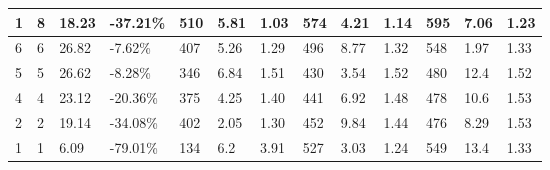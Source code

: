 \begin{table*}[!ht]
\begin{tabular}{|l|l|l|l|l|l|l|l|l|l|l|l|l|}
        1 & 8 & 18.23 & -37.21\% & 510 & 5.81 & 1.03 & 574 & 4.21 & 1.14 & 595 & 7.06 & 1.23 \\ \hline
        6 & 6 & 26.82 & -7.62\% & 407 & 5.26 & 1.29 & 496 & 8.77 & 1.32 & 548 & 1.97 & 1.33 \\ \hline
        5 & 5 & 26.62 & -8.28\% & 346 & 6.84 & 1.51 & 430 & 3.54 & 1.52 & 480 & 12.4 & 1.52 \\ \hline
        4 & 4 & 23.12 & -20.36\% & 375 & 4.25 & 1.40 & 441 & 6.92 & 1.48 & 478 & 10.6 & 1.53 \\ \hline
        2 & 2 & 19.14 & -34.08\% & 402 & 2.05 & 1.30 & 452 & 9.84 & 1.44 & 476 & 8.29 & 1.53 \\ \hline
        1 & 1 & 6.09 & -79.01\% & 134 & 6.2 & 3.91 & 527 & 3.03 & 1.24 & 549 & 13.4 & 1.33 \\ \hline
    \end{tabular}
    \label{tab:qiws-asym-inference-small}
\end{table*}
